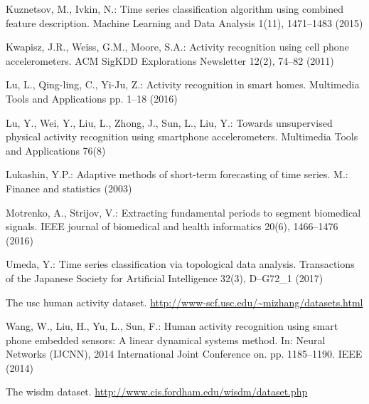 \documentclass[a4paper,12pt]{article}
\begin{document}
\begin{thebibliography}{10}
	Kuznetsov, M., Ivkin, N.: Time series classification algorithm using combined
	feature description. Machine Learning and Data Analysis  1(11),  1471--1483
	(2015)
	
	Kwapisz, J.R., Weiss, G.M., Moore, S.A.: Activity recognition using cell phone
	accelerometers. ACM SigKDD Explorations Newsletter  12(2),  74--82 (2011)
	
	Lu, L., Qing-ling, C., Yi-Ju, Z.: Activity recognition in smart homes.
	Multimedia Tools and Applications pp. 1--18 (2016)
	
	Lu, Y., Wei, Y., Liu, L., Zhong, J., Sun, L., Liu, Y.: Towards unsupervised
	physical activity recognition using smartphone accelerometers. Multimedia
	Tools and Applications  76(8)
	
	Lukashin, Y.P.: Adaptive methods of short-term forecasting of time series. M.:
	Finance and statistics  (2003)
	
	Motrenko, A., Strijov, V.: Extracting fundamental periods to segment biomedical
	signals. IEEE journal of biomedical and health informatics  20(6),
	1466--1476 (2016)
	
	Umeda, Y.: Time series classification via topological data analysis.
	Transactions of the Japanese Society for Artificial Intelligence  32(3),
	D--G72\_1 (2017)
	
	The usc human activity dataset.
	\url{http://www-scf.usc.edu/~mizhang/datasets.html}
	
	Wang, W., Liu, H., Yu, L., Sun, F.: Human activity recognition using smart
	phone embedded sensors: A linear dynamical systems method. In: Neural
	Networks (IJCNN), 2014 International Joint Conference on. pp. 1185--1190.
	IEEE (2014)
	
	The wisdm dataset. \url{http://www.cis.fordham.edu/wisdm/dataset.php}
	
\end{thebibliography}
\end{document}

